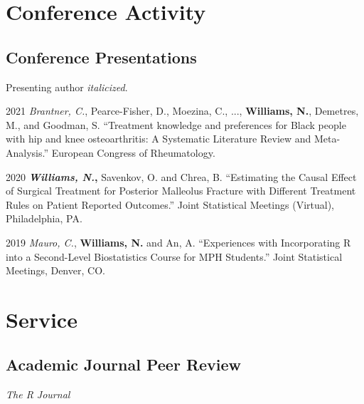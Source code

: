 \documentclass[12pt,letterpaper]{report}
\newcommand{\listitemspace}{0.15em}
\renewenvironment{itemize}
{\begin{list}{}{\setlength{\leftmargin}{0em}
            \setlength{\parskip}{0em}
            \setlength{\itemsep}{\listitemspace}
            \setlength{\parsep}{\listitemspace}}}
    {\end{list}}
\begin{document}
    \section*{Conference Activity}

    \subsection*{Conference Presentations}

    Presenting author \textit{italicized}. \bigskip

    \begin{tablist}
    
    \item[2021] \tab \textit{Brantner, C.}, Pearce-Fisher, D., Moezina, C., ..., \textbf{Williams, N.}, Demetres, M., and Goodman, S. \enquote{Treatment knowledge and preferences for Black people with hip and knee osteoarthritis: A Systematic Literature Review and Meta-Analysis.} European Congress of Rheumatology.
    
	\item[2020] \tab \textbf{\textit{Williams, N.},} Savenkov, O. and Chrea, B. \enquote{Estimating the Causal Effect of Surgical Treatment for Posterior Malleolus Fracture with Different Treatment Rules on Patient Reported Outcomes.} Joint Statistical Meetings (Virtual), Philadelphia, PA.
    
    	\item[2019] \tab \textit{Mauro, C.}, \textbf{Williams, N.} and An, A. \enquote{Experiences with Incorporating R into a Second-Level Biostatistics Course for MPH Students.} Joint Statistical Meetings, Denver, CO.

    \end{tablist}
    
    \section*{Service}
    
    \subsection*{Academic Journal Peer Review}
    
    \begin{itemize}
    
    	\item \textit{The R Journal}
    
    \end{itemize}
\end{document}
